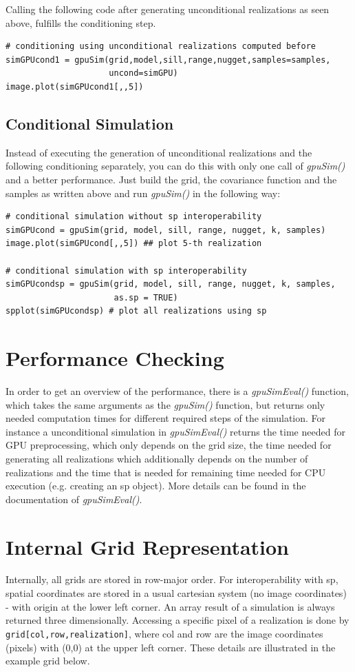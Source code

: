 \documentclass[12pt,oneside,a4paper]{article}
\begin{document}
Calling the following code after generating unconditional realizations as seen above, fulfills the conditioning step.
\begin{verbatim}
# conditioning using unconditional realizations computed before
simGPUcond1 = gpuSim(grid,model,sill,range,nugget,samples=samples,
                     uncond=simGPU)
image.plot(simGPUcond1[,,5])
\end{verbatim}



\subsection{Conditional Simulation}
Instead of executing the generation of unconditional realizations and the following conditioning separately, you can do this with only one call of \emph{gpuSim()} and a better performance.
Just build the grid, the covariance function and the samples as written above and run \emph{gpuSim()} in the following way:

\begin{verbatim}
# conditional simulation without sp interoperability
simGPUcond = gpuSim(grid, model, sill, range, nugget, k, samples)
image.plot(simGPUcond[,,5]) ## plot 5-th realization

# conditional simulation with sp interoperability
simGPUcondsp = gpuSim(grid, model, sill, range, nugget, k, samples,
                      as.sp = TRUE)
spplot(simGPUcondsp) # plot all realizations using sp
\end{verbatim}




\section{Performance Checking}
In order to get an overview of the performance, there is a \emph{gpuSimEval()} function, which takes the same arguments as the \emph{gpuSim()} function, but returns only needed computation times for different required steps of the simulation. For instance a unconditional simulation in \emph{gpuSimEval()} returns the time needed for GPU preprocessing, which only depends on the grid size, the time needed for generating all realizations which additionally depends on the number of realizations and the time that is needed for remaining time needed for CPU execution (e.g. creating an sp object). More details can be found in the documentation of \emph{gpuSimEval()}.


\section{Internal Grid Representation}
Internally, all grids are stored in row-major order. For interoperability with sp, spatial coordinates are stored in a usual cartesian system (no image coordinates) - with origin at the lower left corner. An array result of a simulation is always returned three dimensionally. Accessing a specific pixel of a realization is done by \verb|grid[col,row,realization]|, where col and row are the image coordinates (pixels) with (0,0) at the upper left corner. These details are illustrated in the example grid below.
\end{document}
